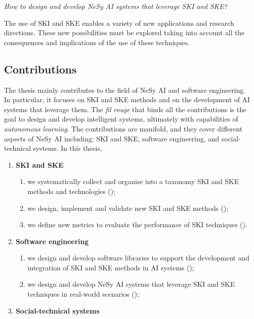 \begin{refsection}
\begin{questions}
    \item \emph{How to design and develop \gls{NeSy} \gls{AI} systems that leverage \gls{SKI} and \gls{SKE}?}

    The use of \gls{SKI} and \gls{SKE} enables a variety of new applications and research directions.
    These new possibilities must be explored taking into account all the consequences and implications of the use of these techniques.
    \label{itm:rq4}
\end{questions}


\subsection*{Contributions}
%
The thesis mainly contributes to the field of \gls{NeSy} \gls{AI} and software engineering.
%
In particular, it focuses on \gls{SKI} and \gls{SKE} methods and on the development of \gls{AI} systems that leverage them.
%
The \textit{fil rouge} that binds all the contributions is the goal to design and develop intelligent systems, ultimately with capabilities of \emph{autonomous learning}.
%
The contributions are manifold, and they cover different aspects of \gls{NeSy} \gls{AI} including: \gls{SKI} and \gls{SKE}, software engineering, and social-technical systems.
%
In this thesis,
%
\begin{enumerate}[label=\emph{(\roman*)}]
    \item \textbf{\gls{SKI} and \gls{SKE}}

    \begin{enumerate}[label=\emph{(\arabic*)},resume]
        \item we systematically collect and organise into a taxonomy \gls{SKI} and \gls{SKE} methods and technologies ();
        \item we design, implement and validate new \gls{SKI} and \gls{SKE} methods ();
        \item we define new metrics to evaluate the performance of \gls{SKI} techniques ().
    \end{enumerate}
    \item \textbf{Software engineering}

    \begin{enumerate}[label=\emph{(\arabic*)},resume]
        \item we design and develop software libraries to support the development and integration of \gls{SKI} and \gls{SKE} methods in \gls{AI} systems ();
        \item we design and develop \gls{NeSy} \gls{AI} systems that leverage \gls{SKI} and \gls{SKE} techniques in real-world scenarios ();
    \end{enumerate}
    \item \textbf{Social-technical systems}


\end{enumerate}
\end{refsection}
